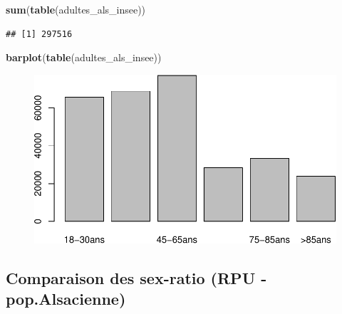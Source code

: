 \documentclass[]{article}
\newenvironment{Shaded}{\begin{snugshade}}{\end{snugshade}}
\newcommand{\KeywordTok}[1]{\textcolor[rgb]{0.13,0.29,0.53}{\textbf{{#1}}}}
\newcommand{\NormalTok}[1]{{#1}}
\begin{document}
\begin{Shaded}
\begin{Highlighting}[]
\KeywordTok{sum}\NormalTok{(}\KeywordTok{table}\NormalTok{(adultes_als_insee))}
\end{Highlighting}
\end{Shaded}

\begin{verbatim}
## [1] 297516
\end{verbatim}

\begin{Shaded}
\begin{Highlighting}[]
\KeywordTok{barplot}\NormalTok{(}\KeywordTok{table}\NormalTok{(adultes_als_insee))}
\end{Highlighting}
\end{Shaded}

\begin{figure}[htbp]
\centering
\includegraphics{age_files/figure-latex/tranches_age_als-1.pdf}
\end{figure}

\subsection{Comparaison des sex-ratio (RPU -
pop.Alsacienne)}\label{comparaison-des-sex-ratio-rpu---pop.alsacienne}
\end{document}
